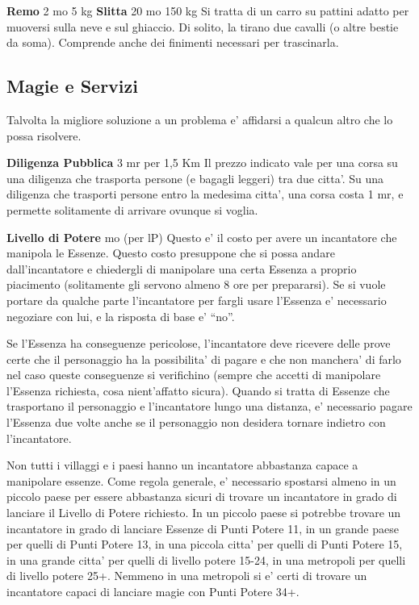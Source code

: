 \documentclass[a4paper,11pt,twoside,openany]{dndbook}
\begin{document}
{\textbf{Remo} 2 mo 5 kg \textbf{Slitta} 20 mo 150 kg Si tratta di un carro su pattini adatto per muoversi sulla neve e sul ghiaccio. Di solito, la tirano due cavalli (o altre bestie da soma). Comprende anche dei finimenti necessari per trascinarla.

\pagebreak

\subsection{Magie e Servizi}

\label{magie-e-servizi}

Talvolta la migliore soluzione a un problema e' affidarsi a qualcun altro che lo possa risolvere.

\textbf{Diligenza Pubblica} 3 mr per 1,5 Km Il prezzo indicato vale per una corsa su una diligenza che trasporta persone (e bagagli leggeri) tra due citta'. Su una diligenza che trasporti persone entro la medesima citta', una corsa costa 1 mr, e permette solitamente di arrivare ovunque si voglia.

\textbf{Livello di Potere}  mo (per lP) Questo e' il costo per avere un incantatore che manipola le Essenze. Questo costo presuppone che si possa andare dall'incantatore e chiedergli di manipolare una certa Essenza a proprio piacimento (solitamente gli servono almeno 8 ore per prepararsi). Se si vuole portare da qualche parte l'incantatore per fargli usare l'Essenza e' necessario negoziare con lui, e la risposta di base e' ``no''.

Se l'Essenza ha conseguenze pericolose, l'incantatore deve ricevere delle prove certe che il personaggio ha la possibilita' di pagare e che non manchera' di farlo nel caso queste conseguenze si verifichino (sempre che accetti di manipolare l'Essenza richiesta, cosa nient'affatto sicura). Quando si tratta di Essenze che trasportano il personaggio e l'incantatore lungo una distanza, e' necessario pagare l'Essenza due volte anche se il personaggio non desidera tornare indietro con l'incantatore.

Non tutti i villaggi e i paesi hanno un incantatore abbastanza capace a manipolare essenze. Come regola generale, e' necessario spostarsi almeno in un piccolo paese per essere abbastanza sicuri di trovare un incantatore in grado di lanciare il Livello di Potere richiesto. In un piccolo paese si potrebbe trovare un incantatore in grado di lanciare Essenze di Punti Potere 11, in un grande paese per quelli di Punti Potere 13, in una piccola citta' per quelli di Punti Potere 15, in una grande citta' per quelli di livello potere 15-24, in una metropoli per quelli di livello potere 25+. Nemmeno in una metropoli si e' certi di trovare un incantatore capaci di lanciare magie con Punti Potere 34+. 

}
\end{document}
